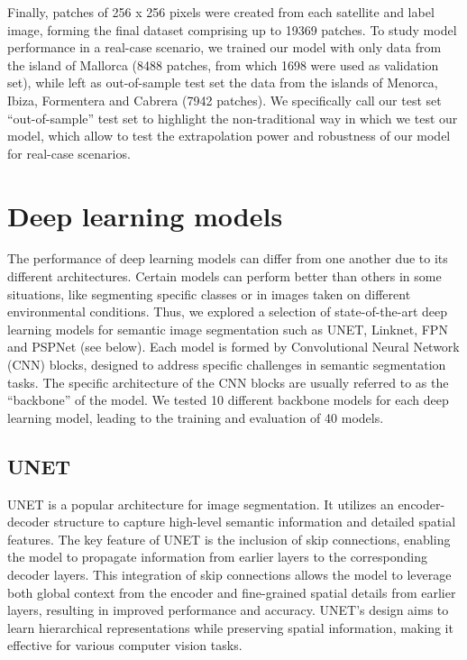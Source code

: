 Finally, patches of 256 x 256 pixels were created from each satellite and
label image, forming the final dataset comprising up to 19369 patches. To study
model performance in a real-case scenario, we trained our model with only data
from the island of Mallorca (8488 patches, from which 1698 were used as
validation set), while left as out-of-sample test set the data from the islands
of Menorca, Ibiza, Formentera and Cabrera (7942 patches). We specifically
call our test set ``out-of-sample'' test set to highlight the non-traditional
way in which we test our model, which allow to test the extrapolation power and
robustness of our model for real-case scenarios.


\section{Deep learning models}\label{app:deep_learning_models}

The performance of deep learning models can differ from one another due to
its different architectures. Certain models can perform better than others in
some situations, like segmenting specific classes or in images taken on
different environmental conditions. Thus, we explored a selection of
state-of-the-art deep learning models for semantic image segmentation such as
UNET, Linknet, FPN and PSPNet (see below). Each model is formed by
Convolutional Neural Network (CNN) blocks, designed to address specific
challenges in semantic segmentation tasks. The specific architecture of the CNN
blocks are usually referred to as the ``backbone'' of the model. We tested 10
different backbone models for each deep learning model, leading to the training
and evaluation of 40 models.

\subsection{UNET}

UNET \cite{Ronneberger2015} is a popular architecture for image
segmentation. It utilizes an encoder-decoder structure to capture high-level
semantic information and detailed spatial features. The key feature of UNET is
the inclusion of skip connections, enabling the model to propagate information
from earlier layers to the corresponding decoder layers. This integration of
skip connections allows the model to leverage both global context from the
encoder and fine-grained spatial details from earlier layers, resulting in
improved performance and accuracy. UNET's design aims to learn hierarchical
representations while preserving spatial information, making it effective for
various computer vision tasks.

